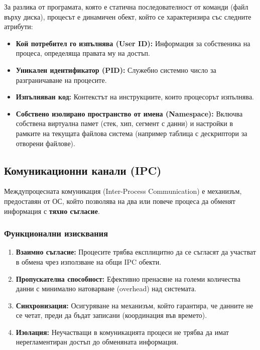 \documentclass{scrartcl}
\begin{document}
\begin{FlushLeft}
За разлика от програмата, която е статична последователност от команди (файл върху диска), процесът е динамичен обект, който се характеризира със следните атрибути:
\begin{itemize}
    \item \textbf{Кой потребител го изпълнява (User ID):} Информация за собственика на процеса, определяща правата му на достъп.
    \item \textbf{Уникален идентификатор (PID):} Служебно системно число за разграничаване на процесите.
    \item \textbf{Изпълняван код:} Контекстът на инструкциите, които процесорът изпълнява.
    \item \textbf{Собствено изолирано пространство от имена (Namespace):} Включва собствена виртуална памет (стек, хип, сегмент с данни) и настройки в рамките на текущата файлова система (например таблица с дескриптори за отворени файлове).
\end{itemize}

\subsection{Комуникационни канали (IPC)}
Междупроцесната комуникация (Inter-Process Communication) е механизъм, предоставян от ОС, който позволява на два или повече процеса да обменят информация с \textbf{тяхно съгласие}.

\subsubsection{Функционални изисквания}
\begin{enumerate}
    \item \textbf{Взаимно съгласие:} Процесите трябва експлицитно да се съгласят да участват в обмена чрез използване на общи IPC обекти.
    \item \textbf{Пропускателна способност:} Ефективно пренасяне на големи количества данни с минимално натоварване (overhead) над системата.
    \item \textbf{Синхронизация:} Осигуряване на механизъм, който гарантира, че данните не се четат, преди да бъдат записани (координация във времето).
    \item \textbf{Изолация:} Неучастващи в комуникацията процеси не трябва да имат нерегламентиран достъп до обменяната информация.
\end{enumerate}


\end{FlushLeft}
\end{document}
